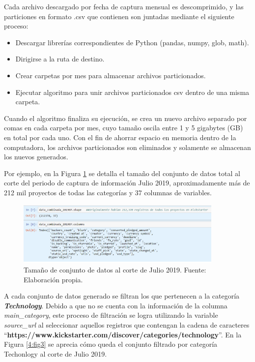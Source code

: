 Cada archivo descargado por fecha de captura mensual es descomprimido, y las particiones en formato .csv que contienen son juntadas mediante el siguiente proceso:

\begin{itemize}
	\item Descargar librerías correspondientes de Python (pandas, numpy, glob, math).
	\item Dirigirse a la ruta de destino.
	\item Crear carpetas por mes para almacenar archivos particionados.
	\item Ejecutar algoritmo para unir archivos particionados csv dentro de una misma carpeta.
\end{itemize}

Cuando el algoritmo finaliza su ejecución, se crea un nuevo archivo separado por comas en cada carpeta por mes, cuyo tamaño oscila entre 1 y 5 gigabytes (GB) en total por cada uno. Con el fin de ahorrar espacio en memoria dentro de la computadora, los archivos particionados son eliminados y solamente se almacenan los nuevos generados.

Por ejemplo, en la Figura \ref{4:fig2} se detalla el tamaño del conjunto de datos total al corte del periodo de captura de información Julio 2019, aproximadamente más de 212 mil proyectos de todas las categorías y 37 columnas de variables.

\begin{figure}[h]
	\begin{center}
		\includegraphics[width=0.9\textwidth]{4/figures/dataset_201907.png}
		\caption{Tamaño de conjunto de datos al corte de Julio 2019. Fuente: Elaboración propia.}
		\label{4:fig2}
	\end{center}
\end{figure}

A cada conjunto de datos generado se filtran los que pertenecen a la categoría \textit{\textbf{Technology}}. Debido a que no se cuenta con la información de la columna \textit{main\_category}, este proceso de filtración se logra utilizando la variable \textit{source\_url} al seleccionar aquellos registros que contengan la cadena de caracteres “\textbf{https://www.kickstarter.com/discover/categories/technology}”. En la Figura \ref{4:fig3} se aprecia cómo queda el conjunto filtrado por categoría Techonlogy al corte de Julio 2019.

